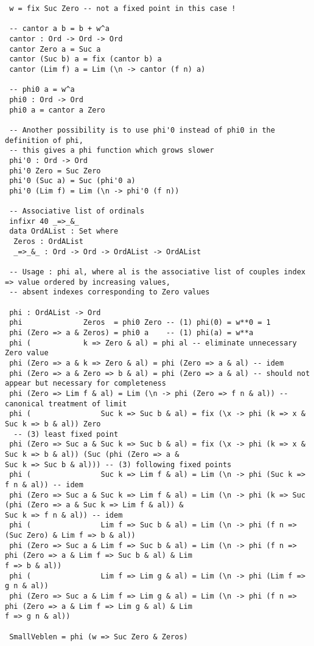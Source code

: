 \documentclass[10pt]{article}
\begin{document}
\begin{verbatim}
 w = fix Suc Zero -- not a fixed point in this case !

 -- cantor a b = b + w^a
 cantor : Ord -> Ord -> Ord
 cantor Zero a = Suc a
 cantor (Suc b) a = fix (cantor b) a
 cantor (Lim f) a = Lim (\n -> cantor (f n) a)

 -- phi0 a = w^a
 phi0 : Ord -> Ord
 phi0 a = cantor a Zero

 -- Another possibility is to use phi'0 instead of phi0 in the definition of phi,
 -- this gives a phi function which grows slower
 phi'0 : Ord -> Ord
 phi'0 Zero = Suc Zero
 phi'0 (Suc a) = Suc (phi'0 a)
 phi'0 (Lim f) = Lim (\n -> phi'0 (f n))

 -- Associative list of ordinals
 infixr 40 _=>_&_
 data OrdAList : Set where
  Zeros : OrdAList
  _=>_&_ : Ord -> Ord -> OrdAList -> OrdAList

 -- Usage : phi al, where al is the associative list of couples index => value ordered by increasing values,
 -- absent indexes corresponding to Zero values

 phi : OrdAList -> Ord 
 phi              Zeros  = phi0 Zero -- (1) phi(0) = w**0 = 1 
 phi (Zero => a & Zeros) = phi0 a    -- (1) phi(a) = w**a
 phi (            k => Zero & al) = phi al -- eliminate unnecessary Zero value
 phi (Zero => a & k => Zero & al) = phi (Zero => a & al) -- idem
 phi (Zero => a & Zero => b & al) = phi (Zero => a & al) -- should not appear but necessary for completeness
 phi (Zero => Lim f & al) = Lim (\n -> phi (Zero => f n & al)) -- canonical treatment of limit
 phi (                Suc k => Suc b & al) = fix (\x -> phi (k => x & Suc k => b & al)) Zero 
  -- (3) least fixed point
 phi (Zero => Suc a & Suc k => Suc b & al) = fix (\x -> phi (k => x & Suc k => b & al)) (Suc (phi (Zero => a & 
Suc k => Suc b & al))) -- (3) following fixed points
 phi (                Suc k => Lim f & al) = Lim (\n -> phi (Suc k => f n & al)) -- idem 
 phi (Zero => Suc a & Suc k => Lim f & al) = Lim (\n -> phi (k => Suc (phi (Zero => a & Suc k => Lim f & al)) & 
Suc k => f n & al)) -- idem  
 phi (                Lim f => Suc b & al) = Lim (\n -> phi (f n => (Suc Zero) & Lim f => b & al)) 
 phi (Zero => Suc a & Lim f => Suc b & al) = Lim (\n -> phi (f n => phi (Zero => a & Lim f => Suc b & al) & Lim 
f => b & al))
 phi (                Lim f => Lim g & al) = Lim (\n -> phi (Lim f => g n & al))
 phi (Zero => Suc a & Lim f => Lim g & al) = Lim (\n -> phi (f n => phi (Zero => a & Lim f => Lim g & al) & Lim 
f => g n & al)) 

 SmallVeblen = phi (w => Suc Zero & Zeros)


\end{verbatim}
\end{document}
